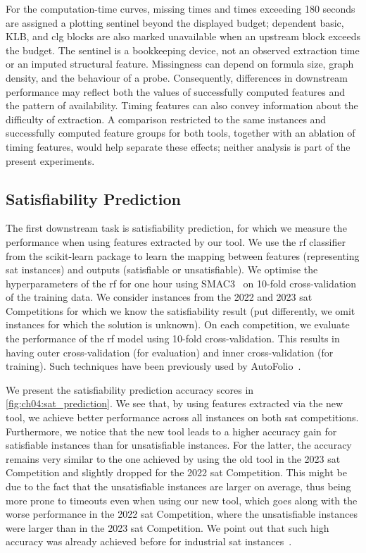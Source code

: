For the computation-time curves, missing times and times exceeding 180 seconds are assigned a plotting sentinel beyond the displayed budget; dependent basic, KLB, and \gls{clg} blocks are also marked unavailable when an upstream block exceeds the budget. The sentinel is a bookkeeping device, not an observed extraction time or an imputed structural feature. Missingness can depend on formula size, graph density, and the behaviour of a probe. Consequently, differences in downstream performance may reflect both the values of successfully computed features and the pattern of availability. Timing features can also convey information about the difficulty of extraction. A comparison restricted to the same instances and successfully computed feature groups for both tools, together with an ablation of timing features, would help separate these effects; neither analysis is part of the present experiments.

\subsection{Satisfiability Prediction}
\label{sec:ch04:satisfiability-prediction}

The first downstream task is satisfiability prediction, for which we measure the performance when using features extracted by our tool.
We use the \gls{rf} classifier from the scikit-learn package to learn the mapping between features (representing \gls{sat} instances) and outputs (satisfiable or unsatisfiable). We optimise the hyperparameters of the \gls{rf} for one hour using SMAC3~\cite{LinEtAl22b} on 10-fold cross-validation of the training data.
We consider instances from the 2022 and 2023 \gls{sat} Competitions for which we know the satisfiability result (put differently, we omit instances for which the solution is unknown). On each competition, we evaluate the performance of the \gls{rf} model using 10-fold cross-validation. This results in having outer cross-validation (for evaluation) and inner cross-validation (for training). Such techniques have been previously used by AutoFolio~\cite{LinEtAl15}.

We present the satisfiability prediction accuracy scores in \cref{fig:ch04:sat_prediction}. We see that, by using features extracted via the new tool, we achieve better performance across all instances on both \gls{sat} competitions. Furthermore, we notice that the new tool leads to a higher accuracy gain for satisfiable instances than for unsatisfiable instances. For the latter, the accuracy remains very similar to the one achieved by using the old tool in the 2023 \gls{sat} Competition and slightly dropped for the 2022 \gls{sat} Competition. This might be due to the fact that the unsatisfiable instances are larger on average, thus being more prone to timeouts even when using our new tool, which goes along with the worse performance in the 2022 \gls{sat} Competition, where the unsatisfiable instances were larger than in the 2023 \gls{sat} Competition. We point out that such high accuracy was already achieved before for industrial \gls{sat} instances~\cite{DevOSu08}.

